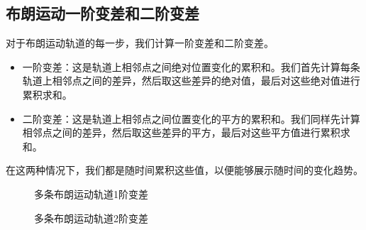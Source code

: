 \documentclass[12pt,a4paper]{article}
\begin{document}
\subsection{布朗运动一阶变差和二阶变差}
对于布朗运动轨道的每一步，我们计算一阶变差和二阶变差。
\begin{itemize}
    \item 一阶变差：这是轨道上相邻点之间绝对位置变化的累积和。我们首先计算每条轨道上相邻点之间的差异，然后取这些差异的绝对值，最后对这些绝对值进行累积求和。
    \item 二阶变差：这是轨道上相邻点之间位置变化的平方的累积和。我们同样先计算相邻点之间的差异，然后取这些差异的平方，最后对这些平方值进行累积求和。
\end{itemize}
在这两种情况下，我们都是随时间累积这些值，以便能够展示随时间的变化趋势。
\begin{figure}[t]
    \centering
\caption{多条布朗运动轨道1阶变差}
\label{fig:1d}
\end{figure}
\begin{figure}[t]
    \centering
\caption{多条布朗运动轨道2阶变差}
\label{fig:2d}
\end{figure}
\end{document}
